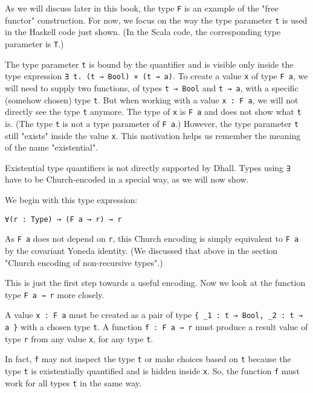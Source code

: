As we will discuss later in this book, the type \lstinline!F! is an example of the "free functor" construction.
For now, we focus on the way the type parameter \lstinline!t! is used in the Haskell code just shown. (In the Scala code, the corresponding type parameter is \lstinline!T!.)


The type parameter \lstinline!t! is bound by the quantifier and is visible only inside the type expression \lstinline!∃ t. (t → Bool) × (t → a)!.
To create a value \lstinline!x! of type \lstinline!F a!, we will need to supply two functions, of types \lstinline!t → Bool! and \lstinline!t → a!, with a specific (somehow chosen) type \lstinline!t!.
But when working with a value \lstinline!x : F a!, we will not directly see the type \lstinline!t! anymore.
The type of \lstinline!x! is \lstinline!F a! and does not show what \lstinline!t! is.
(The type \lstinline!t! is not a type parameter of \lstinline!F a!.)
However, the type parameter \lstinline!t! still "exists" inside the value \lstinline!x!.
This motivation helps us remember the meaning of the name "existential".


Existential type quantifiers is not directly supported by Dhall.
Types using \lstinline!∃! have to be Church-encoded in a special way, as we will now show.


We begin with this type expression:


\begin{lstlisting}[language=Dhall]
∀(r : Type) → (F a → r) → r
\end{lstlisting}


As \lstinline!F a! does not depend on \lstinline!r!, this Church encoding is simply equivalent to \lstinline!F a! by the covariant Yoneda identity. (We discussed that above in the section "Church encoding of non-recursive types".)


This is just the first step towards a useful encoding.
Now we look at the function type \lstinline!F a → r! more closely.


A value \lstinline!x : F a! must be created as a pair of type \lstinline!{ _1 : t → Bool, _2 : t → a }! with a chosen type \lstinline!t!.
A function \lstinline!f : F a → r! must produce a result value of type \lstinline!r! from any value \lstinline!x!, for any type \lstinline!t!.


In fact, \lstinline!f! may not inspect the type \lstinline!t! or make choices based on \lstinline!t! because the type \lstinline!t! is existentially quantified and is hidden inside \lstinline!x!.
So, the function \lstinline!f! must work for all types \lstinline!t! in the same way.


